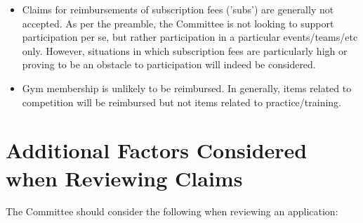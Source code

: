 \begin{itemize}
	\item Claims for reimbursements of subscription fees ('subs') are generally not accepted. As per the preamble, the Committee is not looking to support participation per se, but rather participation in a particular events/teams/etc only. However, situations in which subscription fees are particularly high or proving to be an obstacle to participation will indeed be considered.
	\item Gym membership is unlikely to be reimbursed. In generally, items related to competition will be reimbursed but not items related to practice/training.
\end{itemize}

\section{Additional Factors Considered when Reviewing Claims}
The Committee should consider the following when reviewing an application:
